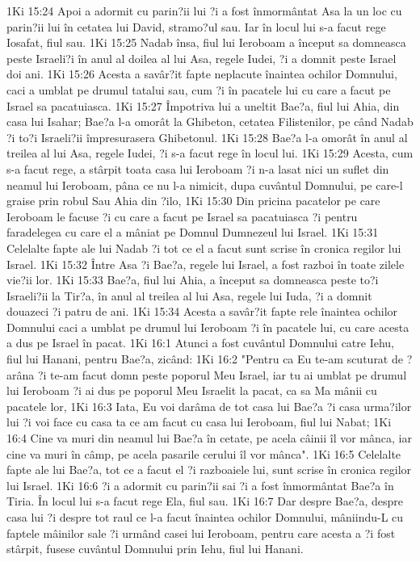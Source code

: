 1Ki 15:24  Apoi a adormit cu parin?ii lui ?i a fost înmormântat Asa la un loc cu parin?ii lui în cetatea lui David, stramo?ul sau. Iar în locul lui s-a facut rege Iosafat, fiul sau.
1Ki 15:25  Nadab însa, fiul lui Ieroboam a început sa domneasca peste Israeli?i în anul al doilea al lui Asa, regele Iudei, ?i a domnit peste Israel doi ani.
1Ki 15:26  Acesta a savâr?it fapte neplacute înaintea ochilor Domnului, caci a umblat pe drumul tatalui sau, cum ?i în pacatele lui cu care a facut pe Israel sa pacatuiasca.
1Ki 15:27  Împotriva lui a uneltit Bae?a, fiul lui Ahia, din casa lui Isahar; Bae?a l-a omorât la Ghibeton, cetatea Filistenilor, pe când Nadab ?i to?i Israeli?ii împresurasera Ghibetonul.
1Ki 15:28  Bae?a l-a omorât în anul al treilea al lui Asa, regele Iudei, ?i s-a facut rege în locul lui.
1Ki 15:29  Acesta, cum s-a facut rege, a stârpit toata casa lui Ieroboam ?i n-a lasat nici un suflet din neamul lui Ieroboam, pâna ce nu l-a nimicit, dupa cuvântul Domnului, pe care-l graise prin robul Sau Ahia din ?ilo,
1Ki 15:30  Din pricina pacatelor pe care Ieroboam le facuse ?i cu care a facut pe Israel sa pacatuiasca ?i pentru faradelegea cu care el a mâniat pe Domnul Dumnezeul lui Israel.
1Ki 15:31  Celelalte fapte ale lui Nadab ?i tot ce el a facut sunt scrise în cronica regilor lui Israel.
1Ki 15:32  Între Asa ?i Bae?a, regele lui Israel, a fost razboi în toate zilele vie?ii lor.
1Ki 15:33  Bae?a, fiul lui Ahia, a început sa domneasca peste to?i Israeli?ii la Tir?a, în anul al treilea al lui Asa, regele lui Iuda, ?i a domnit douazeci ?i patru de ani.
1Ki 15:34  Acesta a savâr?it fapte rele înaintea ochilor Domnului caci a umblat pe drumul lui Ieroboam ?i în pacatele lui, cu care acesta a dus pe Israel în pacat.
1Ki 16:1  Atunci a fost cuvântul Domnului catre Iehu, fiul lui Hanani, pentru Bae?a, zicând:
1Ki 16:2  "Pentru ca Eu te-am scuturat de ?arâna ?i te-am facut domn peste poporul Meu Israel, iar tu ai umblat pe drumul lui Ieroboam ?i ai dus pe poporul Meu Israelit la pacat, ca sa Ma mânii cu pacatele lor,
1Ki 16:3  Iata, Eu voi darâma de tot casa lui Bae?a ?i casa urma?ilor lui ?i voi face cu casa ta ce am facut cu casa lui Ieroboam, fiul lui Nabat;
1Ki 16:4  Cine va muri din neamul lui Bae?a în cetate, pe acela câinii îl vor mânca, iar cine va muri în câmp, pe acela pasarile cerului îl vor mânca".
1Ki 16:5  Celelalte fapte ale lui Bae?a, tot ce a facut el ?i razboaiele lui, sunt scrise în cronica regilor lui Israel.
1Ki 16:6  ?i a adormit cu parin?ii sai ?i a fost înmormântat Bae?a în Tiria. În locul lui s-a facut rege Ela, fiul sau.
1Ki 16:7  Dar despre Bae?a, despre casa lui ?i despre tot raul ce l-a facut înaintea ochilor Domnului, mâniindu-L cu faptele mâinilor sale ?i urmând casei lui Ieroboam, pentru care acesta a ?i fost stârpit, fusese cuvântul Domnului prin Iehu, fiul lui Hanani.
